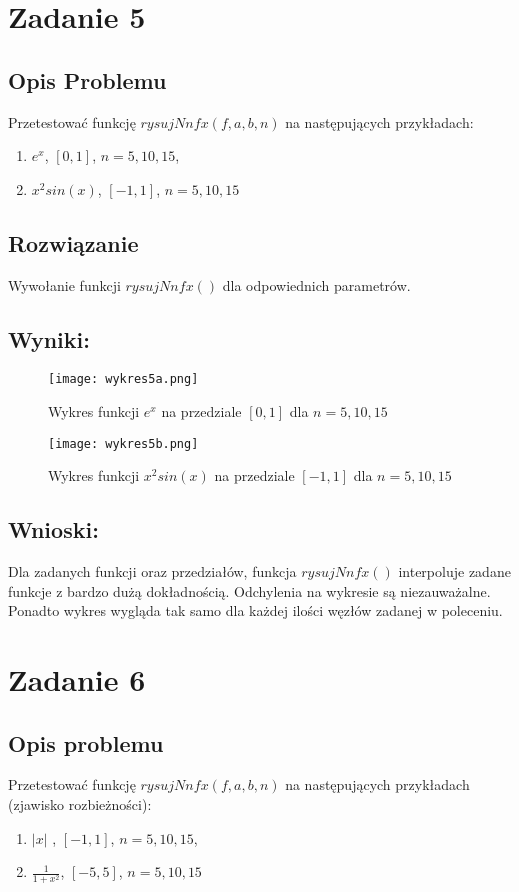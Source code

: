 \documentclass{article}
\begin{document}
\section{Zadanie 5}
\subsection{Opis Problemu}
Przetestować funkcję $rysujNnfx(f,a,b,n)$ na następujących przykładach:\\
\begin{enumerate}
	\item $e^x$, $[0,1]$, $n=5,10,15$,
	\item $x^2sin(x)$, $[-1,1]$, $n=5,10,15$
\end{enumerate}
\subsection{Rozwiązanie}
Wywołanie funkcji $rysujNnfx()$ dla odpowiednich parametrów.
\subsection{Wyniki:}
	\begin{figure}[H]
	\centering
	\texttt{[image: wykres5a.png]}
	\caption{Wykres funkcji $e^{x}$ na przedziale $[0,1]$  dla $n = 5,10,15$}
\end{figure}
	\begin{figure}[H]
	\centering
	\texttt{[image: wykres5b.png]}
	\caption{Wykres funkcji $x^2 sin(x)$ na przedziale $[-1,1]$  dla $n = 5,10,15$}
\end{figure}
\subsection{Wnioski:}
Dla zadanych funkcji oraz przedziałów, funkcja $rysujNnfx()$ interpoluje zadane funkcje z bardzo dużą dokładnością. Odchylenia na wykresie są niezauważalne. Ponadto wykres wygląda tak samo dla każdej ilości węzłów zadanej w poleceniu.

\newpage
\section{Zadanie 6}
\subsection{Opis problemu}
Przetestować funkcję $rysujNnfx(f,a,b,n)$ na następujących przykładach (zjawisko rozbieżności):\\
\begin{enumerate}
	\item $|x|$ , $[-1,1]$, $n=5,10,15$,
	\item $\frac{1}{1+x^2}$, $[-5,5]$, $n=5,10,15$
\end{enumerate}
\end{document}
